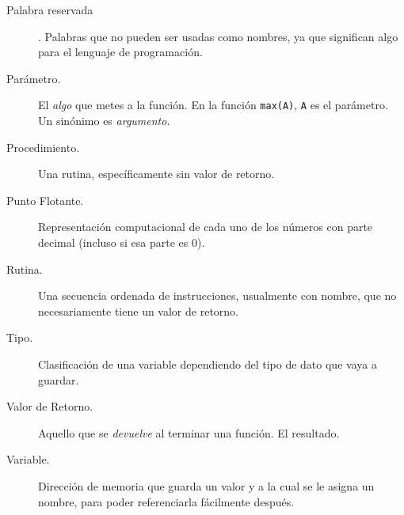 \documentclass[letter,spanish,9pt]{extarticle}
\begin{document}
\begin{multicols*}{2}
\begin{description}
  \item [Palabra reservada]. Palabras que no pueden ser usadas como nombres, ya que significan algo para el lenguaje de programación.
  \item [Parámetro.] El \textit{algo} que metes a la función. En la función \texttt{max(A)}, \texttt{A} es el parámetro. Un sinónimo es \textit{argumento}.
  \item [Procedimiento.] Una rutina, específicamente sin valor de retorno.
  \item [Punto Flotante.] Representación computacional de cada uno de los números con parte decimal (incluso si esa parte es 0).
  \item [Rutina.] Una secuencia ordenada de instrucciones, usualmente con nombre, que no necesariamente tiene un valor de retorno.
  \item [Tipo.] Clasificación de una variable dependiendo del tipo de dato que vaya a guardar.
  \item [Valor de Retorno.] Aquello que se \textit{devuelve} al terminar una función. El resultado.
  \item [Variable.] Dirección de memoria que guarda un valor y a la cual se le asigna un nombre, para poder referenciarla fácilmente después.  
\end{description}

\section*{}

\end{multicols*}
\end{document}
